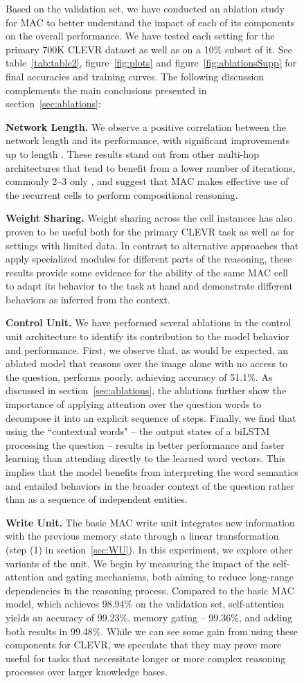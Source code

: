 \documentclass[fleqn]{article}
\newcommand{\figref}[1]{figure~\ref{fig:#1}}
\newcommand{\tabref}[1]{table~\ref{tab:#1}}
\newcommand{\secref}[1]{section~\ref{sec:#1}}
\begin{document}
\begin{figure}[t]
\begin{minipage}{0.55\textwidth}
Based on the validation set, we have conducted an ablation study for MAC to better understand the impact of each of its components on the overall performance. We have tested each setting for the primary 700K CLEVR dataset as well as on a 10\% subset of it. See \tabref{table2}, \figref{plots} and \figref{ablationsSupp} for final accuracies and training curves. The following discussion complements the main conclusions presented in \secref{ablations}:

\textbf{Network Length.} We observe a positive correlation between the network length and its performance, with significant improvements up to length . These results stand out from other multi-hop architectures that tend to benefit from a lower number of iterations, commonly 2--3 only \citep{saAtt, dmn}, and suggest that MAC makes effective use of the recurrent cells to perform compositional reasoning.



\textbf{Weight Sharing.} Weight sharing across the  cell instances has also proven to be useful both for the primary CLEVR task as well as for settings with limited data. 
In contrast to alternative approaches that apply specialized modules for different parts of the reasoning, these results provide some evidence for the ability of the same MAC cell to adapt its behavior to the task at hand and demonstrate different behaviors as inferred from the context.

\textbf{Control Unit.} We have performed several ablations in the control unit architecture to identify its contribution to the model behavior and performance. First, we observe that, as would be expected, an ablated model that reasons over the image alone with no access to the question, performs poorly, achieving accuracy of 51.1\%. As discussed in \secref{ablations}, the ablations further show the importance of applying attention over the question words to decompose it into an explicit sequence of steps. Finally, we find that using the ``contextual words" -- the output states of a biLSTM processing the question -- results in better performance and faster learning than attending directly to the learned word vectors. This implies that the model benefits from interpreting the word semantics and entailed behaviors in the broader context of the question rather than as a sequence of independent entities.

\textbf{Write Unit.} The basic MAC write unit integrates new information  with the previous memory state  through a linear transformation (step (1) in \secref{WU}). In this experiment, we explore other variants of the unit. We begin by measuring the impact of the self-attention and gating mechanisms, both aiming to reduce long-range dependencies in the reasoning process. Compared to the basic MAC model, which achieves 98.94\% on the validation set, self-attention yields an accuracy of 99.23\%, memory gating -- 99.36\%, and adding both results in 99.48\%. While we can see some gain from using these components for CLEVR, we speculate that they may prove more useful for tasks that necessitate longer or more complex reasoning processes over larger knowledge bases. 


\end{minipage}
\end{figure}
\end{document}
